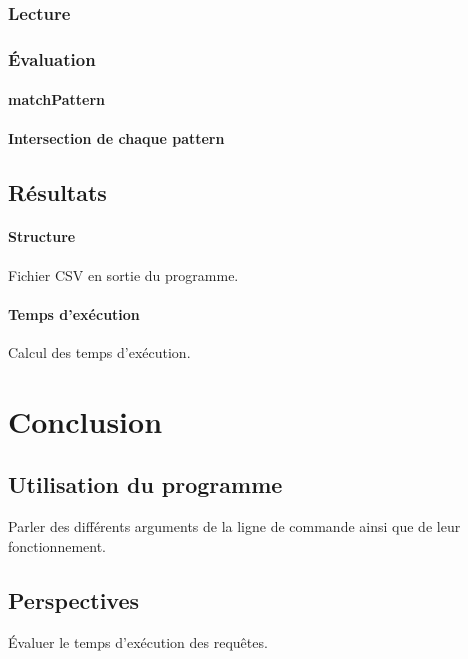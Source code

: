 \documentclass[12pt,titlepage]{article}
\begin{document}
\subsubsection{Lecture}

\subsubsection{Évaluation}

\paragraph{matchPattern}

\paragraph{Intersection de chaque pattern}

\subsection{Résultats}

\paragraph{Structure}

Fichier CSV en sortie du programme.

\paragraph{Temps d'exécution}

Calcul des temps d'exécution.

\section{Conclusion}

\subsection{Utilisation du programme}

Parler des différents arguments de la ligne de commande ainsi que de leur fonctionnement.

\subsection{Perspectives}

Évaluer le temps d'exécution des requêtes.
\end{document}
